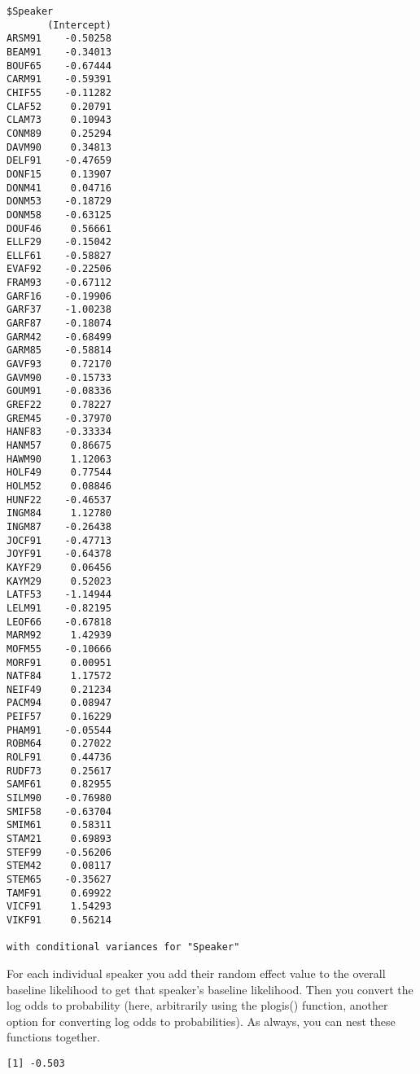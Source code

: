 \documentclass[
  10pt,
  letterpaper]{article}
\newenvironment{Shaded}{\begin{snugshade}}{\end{snugshade}}
\newcommand{\CommentTok}[1]{\textcolor[rgb]{0.37,0.37,0.37}{#1}}
\newcommand{\FunctionTok}[1]{\textcolor[rgb]{0.28,0.35,0.67}{#1}}
\newcommand{\NormalTok}[1]{\textcolor[rgb]{0.00,0.23,0.31}{#1}}
\newcommand{\SpecialCharTok}[1]{\textcolor[rgb]{0.37,0.37,0.37}{#1}}
\newcommand{\StringTok}[1]{\textcolor[rgb]{0.13,0.47,0.30}{#1}}
\renewcommand\texttt[1]{{\ttfamily\color{BrickRed}#1}}
\begin{document}
\begin{verbatim}
$Speaker
       (Intercept)
ARSM91    -0.50258
BEAM91    -0.34013
BOUF65    -0.67444
CARM91    -0.59391
CHIF55    -0.11282
CLAF52     0.20791
CLAM73     0.10943
CONM89     0.25294
DAVM90     0.34813
DELF91    -0.47659
DONF15     0.13907
DONM41     0.04716
DONM53    -0.18729
DONM58    -0.63125
DOUF46     0.56661
ELLF29    -0.15042
ELLF61    -0.58827
EVAF92    -0.22506
FRAM93    -0.67112
GARF16    -0.19906
GARF37    -1.00238
GARF87    -0.18074
GARM42    -0.68499
GARM85    -0.58814
GAVF93     0.72170
GAVM90    -0.15733
GOUM91    -0.08336
GREF22     0.78227
GREM45    -0.37970
HANF83    -0.33334
HANM57     0.86675
HAWM90     1.12063
HOLF49     0.77544
HOLM52     0.08846
HUNF22    -0.46537
INGM84     1.12780
INGM87    -0.26438
JOCF91    -0.47713
JOYF91    -0.64378
KAYF29     0.06456
KAYM29     0.52023
LATF53    -1.14944
LELM91    -0.82195
LEOF66    -0.67818
MARM92     1.42939
MOFM55    -0.10666
MORF91     0.00951
NATF84     1.17572
NEIF49     0.21234
PACM94     0.08947
PEIF57     0.16229
PHAM91    -0.05544
ROBM64     0.27022
ROLF91     0.44736
RUDF73     0.25617
SAMF61     0.82955
SILM90    -0.76980
SMIF58    -0.63704
SMIM61     0.58311
STAM21     0.69893
STEF99    -0.56206
STEM42     0.08117
STEM65    -0.35627
TAMF91     0.69922
VICF91     1.54293
VIKF91     0.56214

with conditional variances for "Speaker" 
\end{verbatim}

For each individual speaker you add their random effect value to the
overall baseline likelihood to get that speaker's baseline likelihood.
Then you convert the log odds to probability (here, arbitrarily using
the \texttt{plogis()} function, another option for converting log odds
to probabilities). As always, you can nest these functions together.

\begin{Shaded}
\end{Shaded}

\begin{verbatim}
[1] -0.503
\end{verbatim}

\begin{Shaded}
\end{Shaded}
\end{document}

